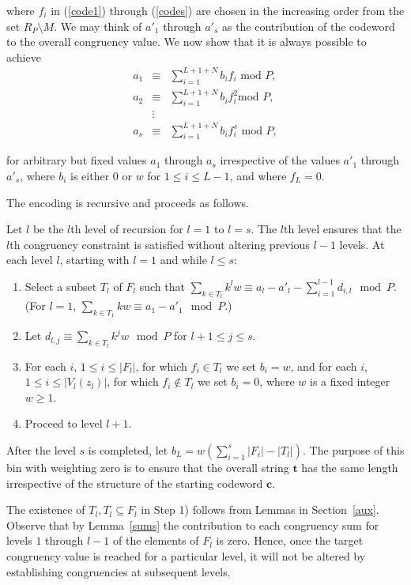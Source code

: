 where $f_i$ in (\ref{code1}) through (\ref{codes}) are chosen in
the increasing order from the set $R_P\setminus M$. We may think
of ${a'}_1$ through ${a'}_s$ as the contribution of the codeword
to the overall congruency value. We now show that it is always
possible to achieve
\begin{eqnarray}\label{s1} a_1 &\equiv& \sum_{i=1}^{L+1+N} b_i f_i
\text{ mod } P, \\ a_2 &\equiv& \sum_{i=1}^{L+1+N} b_i f_i^2
\text{
mod } P,\\ &\vdots& \\
a_s &\equiv& \sum_{i=1}^{L+1+N} b_i f_i^s \text{ mod }
P\label{s2},\end{eqnarray}

for arbitrary but fixed values $a_1$ through $a_s$ irrespective of
the values ${a'}_1$ through ${a'}_s$, where $b_i$ is either $0$ or
$w$ for $1 \leq i \leq L-1$, and where $f_L=0$.

The encoding is recursive and proceeds as follows.

Let $l$ be the $l$th level of recursion for $l=1$ to $l=s$. The
$l$th level ensures that the $l$th congruency constraint is
satisfied without altering previous $l-1$ levels.
 At each level $l$, starting with $l=1$ and while $l \leq s$:
\begin{enumerate}
 \item Select a subset $T_{l}$ of $F_l$ such that $\sum_{k \in T_l} k^lw \equiv a_l - {a'}_l -
\sum_{i=1}^{l-1} d_{i,l} \mod P$. (For $l=1$, $\sum_{k \in T_1} kw
\equiv a_1 - {a'}_1 \mod P$.)\item Let $d_{l,j} \equiv \sum_{k \in
T_l} k^jw \mod P$ for $l+1 \leq j\leq s$. \item For each $i$, $1
\leq i \leq |F_l|$, for which $f_i \in T_l$ we set $b_i=w$, and
for each $i$, $1 \leq i \leq |V_l(z_l)|$, for which $f_i \notin
T_l$ we set $b_i=0$, where $w$ is a fixed integer $w \geq 1$.
\item Proceed to level $l+1$.
\end{enumerate}

After the level $s$ is completed, let $b_L=w(\sum_{i=1}^s |F_i|-
|T_l|)$. The purpose of this bin with weighting zero is to ensure
that the overall string $\mathbf{t}$ has the same length
irrespective of the structure of the starting codeword
$\mathbf{c}$.

The existence of $T_l, T_l \subseteq F_l$ in Step 1) follows from
Lemmas in Section~\ref{aux}. Observe that by Lemma~\ref{sums} the
contribution to each congruency sum for levels $1$ through $l-1$
of the elements of $F_l$ is zero. Hence, once the target
congruency value is reached for a particular level, it will not be
altered by establishing congruencies at subsequent levels.


